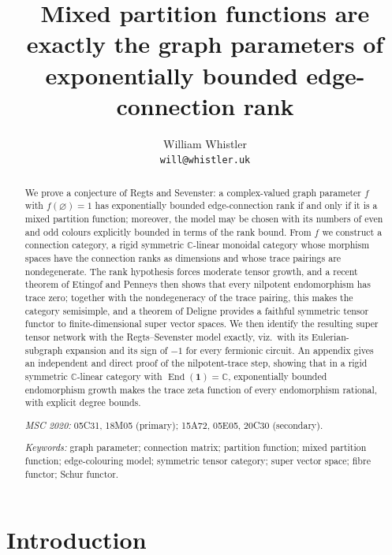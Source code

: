 \documentclass[11pt]{article}
\title{Mixed partition functions are exactly the graph parameters of
exponentially bounded edge-connection rank}
\author{William Whistler\\
\texttt{will@whistler.uk}}
\date{}
\newcommand{\emptygraph}{\varnothing}
\newcommand{\unitobj}{\mathbf{1}}                 %
\newcommand{\End}{\operatorname{End}}
\begin{document}
\maketitle

\begin{abstract}
We prove a conjecture of Regts and Sevenster: a complex-valued graph
parameter $f$ with $f(\emptygraph)=1$ has exponentially bounded
edge-connection rank if and only if it is a mixed partition function;
moreover, the model may be chosen with its numbers of even and odd
colours explicitly bounded in terms of the rank bound. From $f$ we
construct a connection category, a rigid symmetric
$\mathbb{C}$-linear monoidal category
whose morphism spaces have the connection ranks as dimensions and
whose trace pairings are nondegenerate. The rank hypothesis forces
moderate tensor growth, and a recent theorem of Etingof and Penneys
then shows that every nilpotent endomorphism has trace zero; together
with the nondegeneracy of the trace pairing, this makes the category
semisimple, and a theorem of Deligne provides a faithful symmetric
tensor functor to finite-dimensional super vector spaces. We then
identify the resulting super tensor network with the Regts--Sevenster
model exactly, viz.\ with its Eulerian-subgraph expansion and its sign
of $-1$ for every fermionic circuit. An appendix gives an independent and
direct proof of the nilpotent-trace step, showing that in a rigid
symmetric $\mathbb{C}$-linear category with
$\End(\unitobj)=\mathbb{C}$, exponentially
bounded endomorphism growth makes
the trace zeta function of every endomorphism rational, with explicit
degree bounds.

\medskip
\noindent\textit{MSC 2020:} 05C31, 18M05 (primary); 15A72, 05E05,
20C30 (secondary).

\noindent\textit{Keywords:} graph parameter; connection matrix;
partition function; mixed partition function; edge-colouring
model; symmetric tensor category; super vector space; fibre
functor; Schur functor.
\end{abstract}

\tableofcontents

\section{Introduction}\label{sec:intro}
\end{document}

